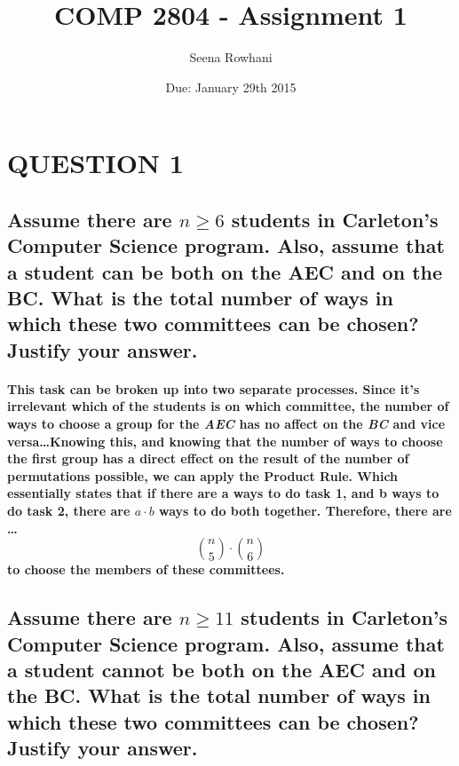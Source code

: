 \documentclass{amsart}
\theoremstyle{definition}
\theoremstyle{remark}
\numberwithin{equation}{section}
\begin{document}
\title{COMP 2804 - Assignment 1}
\author{Seena Rowhani}


\date{Due: January 29th 2015}


\maketitle




\section*{QUESTION 1}
\subsection*{Assume there are $n \geq 6$ students in Carleton's Computer Science 
      program. Also, assume that a student can be both on the AEC and 
      on the BC. What is the total number of ways in which these two 
      committees can be chosen? Justify your answer. }

\paragraph{\newline
	This task can be broken up into two separate processes. Since it's irrelevant which of the students is on which committee, the number of ways to choose a group for the \textit{AEC} has no affect on the \textit{BC} and vice versa\dots\newline\newline Knowing this, and knowing that the number of ways to choose the first group has a direct effect on the result of the number of permutations possible, we can apply the \textbf{Product Rule}. Which essentially states that if there are \textbf{a} ways to do task 1, and \textbf{b} ways to do task 2, there are $a \cdot b$ ways to do \textbf{both together}. Therefore, there are \dots
	$${n \choose 5} \cdot {n \choose 6}$$\newline
to choose the members of these committees. 
}
\subsection*{Assume there are $n \geq 11$ students in Carleton's Computer Science 
      program. Also, assume that a student cannot be both on the AEC and 
      on the BC. What is the total number of ways in which these two 
      committees can be chosen? Justify your answer. }
\end{document}
